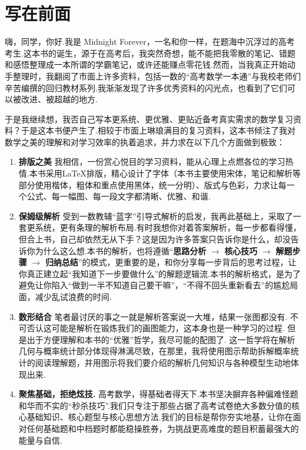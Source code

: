 \chapter*{写在前面}
	\thispagestyle{fancy} 

	\lettrine{嗨}{，同学}，你好.我是 Midnight Forever，一名和你一样，在题海中沉浮过的高考考生.这本书的诞生，源于在高考后，我突然奇想，能不能把我零散的笔记、错题和感悟整理成一本所谓的学霸笔记，或许还能赚点零花钱.然而，当我真正开始动手整理时，我翻阅了市面上许多资料，包括一数的“高考数学一本通”与我校老师们辛苦编撰的回归教材系列.我渐渐发现了许多优秀资料的闪光点，也看到了它们可以被改进、被超越的地方.
	
	于是我继续想，我否自己写本更系统、更优雅、更贴近备考真实需求的数学复习资料？于是这本书便产生了.相较于市面上琳琅满目的复习资料，这本书倾注了我对数学之美的理解和对学习效率的执着追求，并力求在以下几个方面做到极致：
	
	\begin{enumerate}
		\item \textbf{排版之美}
		我相信，一份赏心悦目的学习资料，能从心理上点燃各位的学习热情.本书采用\LaTeX{}排版，精心设计了字体（本书主要使用宋体，笔记和解析等部分使用楷体，粗体和重点使用黑体，统一分明）、版式与色彩，力求让每一个公式、每一幅图、每一段文字都清晰、优雅、和谐.
		
		\item \textbf{保姆级解析}
		受到一数教辅“蓝字”引导式解析的启发，我再此基础上，采取了一套更系统，更有条理的解析布局.有时我想你对着答案解析，每一步都看得懂，但合上书，自己却依然无从下手？这是因为许多答案只告诉你是什么，却没告诉你为什么这么想.本书的解析，也将遵循“\textbf{思路分析} $\to$ \textbf{核心技巧} $\to$ \textbf{解题步骤} $\to$ \textbf{归纳总结}”的模式，更重要的是，和你分享每一步背后的思考过程，让你真正建立起“我知道下一步要做什么”的解题逻辑流.本书的解析格式，是为了避免让你陷入“做到一半不知道自己要干嘛”，“不得不回头重新看去”的尴尬局面，减少乱试浪费的时间.
		
		\item \textbf{数形结合}
		笔者最讨厌的事之一就是解析答案说一大堆，结果一张图都没有. 不可否认这可能是解析在锻炼我们的画图能力，这本身也是一种学习的过程. 但是出于方便理解和本书的“优雅”哲学，我尽可能的配图了. 这一哲学将在解析几何与概率统计部分体现得淋漓尽致，在那里，我将使用图示帮助拆解概率统计的阅读理解题，并用图示将我们要介绍的解析几何知识与各种模型生动地体现出来.
		
		\item \textbf{聚焦基础，拒绝炫技.}
		高考数学，得基础者得天下.本书坚决摒弃各种偏难怪题和华而不实的“秒杀技巧”.我们只专注于那些占据了高考试卷绝大多数分值的核心基础知识、核心题型与核心思想方法.我们的目标是帮你夯实地基，让你在面对任何基础题和中档题时都能稳操胜券，为挑战更高难度的题目积蓄最强大的能量与自信.
	\end{enumerate}
	
